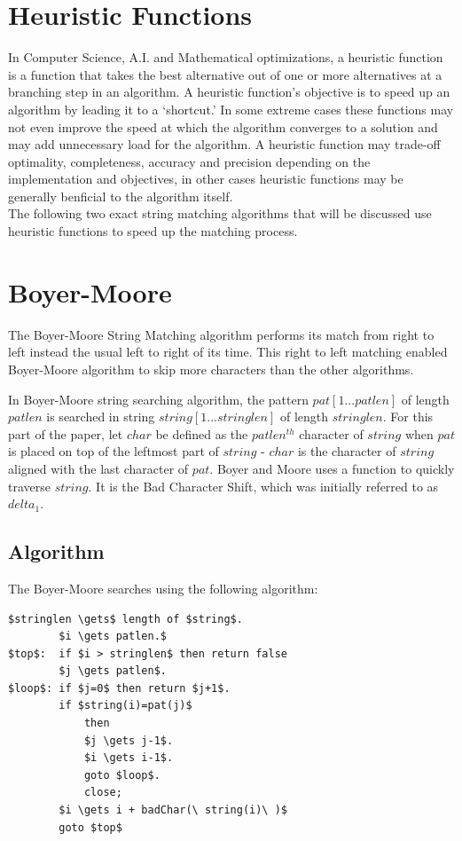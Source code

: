 \section{Heuristic Functions}
In Computer Science, A.I. and Mathematical optimizations, a heuristic function is a function that takes the best alternative out of one or more alternatives at a branching step in an algorithm. A heuristic function's objective is to speed up an algorithm by leading it to a `shortcut.' In some extreme cases these functions may not even improve the speed at which the algorithm converges to a solution and may add unnecessary load for the algorithm. A heuristic function may trade-off optimality, completeness, accuracy and precision depending on the implementation and objectives, in other cases heuristic functions may be generally benficial to the algorithm itself. \\

The following two exact string matching algorithms that will be discussed use heuristic functions to speed up the matching process.

\section{Boyer-Moore}		%
The Boyer-Moore String Matching algorithm performs its match from right to left instead the usual left to right of its time. This right to left matching enabled Boyer-Moore algorithm to skip more characters than the other algorithms\cite{boyerMoore}.

In Boyer-Moore string searching algorithm, the pattern $pat[1 ... patlen]$ of length $patlen$ is searched in string $string[1 ... stringlen]$ of length $stringlen$. For this part of the paper, let $char$ be defined as the $patlen^{th}$ character of $string$ when $pat$ is placed on top of the leftmost part of $string$ - $char$ is the character of $string$ aligned with the last character of $pat$. Boyer and Moore uses a function to quickly traverse $string$. It is the Bad Character Shift, which was initially referred to as $delta_1$.\cite{boyerMoore}

\subsection{Algorithm}
The Boyer-Moore searches using the following algorithm:
\begin{lstlisting}[mathescape=true]
		$stringlen \gets$ length of $string$.
		$i \gets patlen.$
$top$:	if $i > stringlen$ then return false
		$j \gets patlen$.
$loop$:	if $j=0$ then return $j+1$.
		if $string(i)=pat(j)$
			then
			$j \gets j-1$.
			$i \gets i-1$.
			goto $loop$.
			close;
		$i \gets i + badChar(\ string(i)\ )$
		goto $top$
\end{lstlisting}

